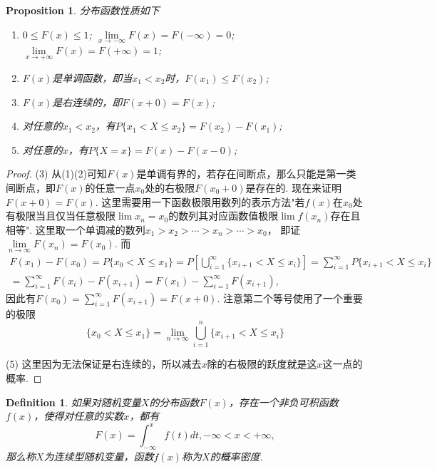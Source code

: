 \documentclass{article}
\newtheorem{proposition}[theorem]{Proposition}
\newtheorem{definition}[theorem]{Definition}
\begin{document}
\begin{proposition}
\rm 分布函数性质如下
\begin{enumerate}
	\item $0 \leq F(x) \leq 1$; $\lim\limits_{x \rightarrow -\infty}F(x) =F(-\infty) = 0$; $\lim\limits_{x \rightarrow +\infty}F(x) =F(+\infty)= 1$;
	\item $F(x)$是单调函数，即当$x_1 < x_2$时，$F(x_1) \leq F(x_2)$;
	\item $F(x)$是右连续的，即$F(x+0) = F(x)$; 
	\item 对任意的$x_1 < x_2$，有$P\{x_1 < X \leq x_2\} = F(x_2) - F(x_1)$;
	\item 对任意的$x$，有$P\{X = x\} = F(x) - F(x-0)$;  
\end{enumerate}
\end{proposition}

\begin{proof}
\rm  {\color{red}(3)} 从(1)(2)可知$F(x)$是单调有界的，若存在间断点，那么只能是第一类间断点，即$F(x)$的任意一点$x_0$处的右极限$F(x_0+0)$是存在的. 现在来证明$F(x+0) = F(x)$. 这里需要用一下函数极限用数列的表示方法"若$f(x)$在$x_0$处有极限当且仅当任意极限$\lim x_n = x_0$的数列其对应函数值极限$\lim f(x_n)$存在且相等". 这里取一个单调减的数列$x_1 > x_2 > \cdots > x_n > \cdots> x_0$， 即证$\lim\limits_{n \rightarrow \infty} F(x_n) = F(x_0)$. 而
$$
\begin{array}{ll}
F(x_1) - F(x_0) =  P\{x_0 < X \leq x_1\} =  P\left[\bigcup\limits_{i=1}^\infty\{x_{i+1} < X \leq x_{i}\}\right] = \sum\limits_{i=1}^\infty P\{x_{i+1} < X \leq x_i\} \\
= \sum\limits_{i=1}^\infty F(x_i) - F(x_{i+1}) =  F(x_1) - \sum\limits_{i=1}^\infty F(x_{i+1}),
\end{array}
$$
因此有$F(x_0) = \sum\limits_{i=1}^\infty F(x_{i+1}) = F(x+0)$. 注意第二个等号使用了一个重要的极限
$$
\{x_0 < X \leq x_1\} = \lim\limits_{n \rightarrow \infty}\bigcup\limits_{i=1}^n\{x_{i+1} < X \leq x_{i}\}
$$

{\color{red}(5)} 这里因为无法保证是右连续的，所以减去$x$除的右极限的跃度就是这$x$这一点的概率.
\end{proof}

\begin{definition}
\rm 如果对随机变量$X$的分布函数$F(x)$，存在一个非负可积函数$f(x)$，使得对任意的实数$x$，都有
$$
F(x) = \int_{-\infty}^x f(t)dt, - \infty < x < + \infty,
$$
那么称$X$为{\color{red}连续型随机变量}，函数$f(x)$称为$X$的{\color{red}概率密度}. 
\end{definition}
\end{document}
